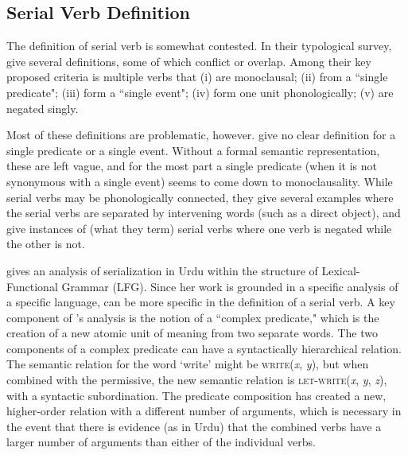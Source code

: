 \subsection{Serial Verb Definition}

The definition of serial verb is somewhat contested. In their typological survey, \cite{aikhenvalddixon2006} give several definitions, some of which conflict or overlap. Among their key proposed criteria is multiple verbs that (i) are monoclausal; (ii) from a ``single predicate"; (iii) form a ``single event"; (iv) form one unit phonologically; (v) are negated singly.

Most of these definitions are problematic, however. \citeauthor{aikhenvalddixon2006} give no clear definition for a single predicate or a single event. Without a formal semantic representation, these are left vague, and for the most part a single predicate (when it is not synonymous with a single event) seems to come down to monoclausality. While serial verbs may be phonologically connected, they give several examples where the serial verbs are separated by intervening words (such as a direct object), and give instances of (what they term) serial verbs where one verb is negated while the other is not.

\cite{butt1995} gives an analysis of serialization in Urdu within the structure of Lexical-Functional Grammar (LFG). Since her work is grounded in a specific analysis of a specific language, \citeauthor{butt1995} can be more specific in the definition of a serial verb. A key component of \citeauthor{butt1995}'s analysis is the notion of a ``complex predicate," which is the creation of a new atomic unit of meaning from two separate words. The two components of a complex predicate can have a syntactically hierarchical relation. The semantic relation for the word `write' might be \textsc{write}(\textit{x}, \textit{y}), but when combined with the permissive, the new semantic relation is \textsc{let-write}(\textit{x}, \textit{y}, \textit{z}), with a syntactic subordination. The predicate composition has created a new, higher-order relation with a different number of arguments, which is necessary in the event that there is evidence (as in Urdu) that the combined verbs have a larger number of arguments than either of the individual verbs.

